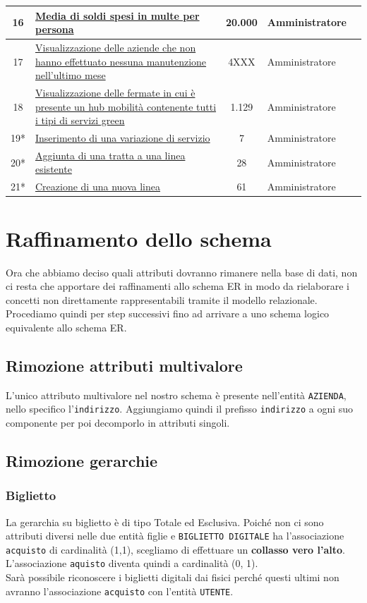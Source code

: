 \documentclass[12pt,a4paper]{report}
\begin{document}
\begin{longtable}{|c|p{8cm}|c|l|l|}
\hline
16 & \hyperref[op16]{Media di soldi spesi in multe per persona} & 20.000 & Amministratore \\
\hline
17 & \hyperref[op17]{Visualizzazione delle aziende che non hanno effettuato nessuna manutenzione nell'ultimo mese} & 4XXX & Amministratore \\
\hline
18 & \hyperref[op18]{Visualizzazione delle fermate in cui è presente un hub mobilità contenente tutti i tipi di servizi green} & 1.129 & Amministratore \\
\hline
19* & \hyperref[op19]{Inserimento di una variazione di servizio} & 7 & Amministratore \\
\hline
20* & \hyperref[op20]{Aggiunta di una tratta a una linea esistente} & 28 & Amministratore \\
\hline
21* & \hyperref[op21]{Creazione di una nuova linea} & 61 & Amministratore \\
\hline
\end{longtable}

\section{Raffinamento dello schema}
Ora che abbiamo deciso quali attributi dovranno rimanere nella base di dati, non ci resta che apportare dei raffinamenti allo schema ER in modo da rielaborare i concetti non direttamente rappresentabili tramite il modello relazionale.
Procediamo quindi per step successivi fino ad arrivare a uno schema logico equivalente allo schema ER.

\subsection{Rimozione attributi multivalore}
L'unico attributo multivalore nel nostro schema è presente nell'entità \texttt{AZIENDA}, nello specifico l'\texttt{indirizzo}.
Aggiungiamo quindi il prefisso \texttt{indirizzo\textunderscore} a ogni suo componente per poi decomporlo in attributi singoli.

\subsection{Rimozione gerarchie}

\subsubsection{Biglietto}
La gerarchia su biglietto è di tipo Totale ed Esclusiva.
Poiché non ci sono attributi diversi nelle due entità figlie e \texttt{BIGLIETTO DIGITALE} ha l'associazione \texttt{acquisto} di cardinalità (1,1), scegliamo di effettuare un \textbf{collasso vero l'alto}.
L'associazione \texttt{aquisto} diventa quindi a cardinalità (0, 1). \\
Sarà possibile riconoscere i biglietti digitali dai fisici perché questi ultimi non avranno l'associazione \texttt{acquisto} con l'entità \texttt{UTENTE}.
\end{document}
